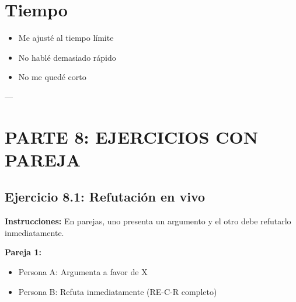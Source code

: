 \documentclass[a4paper,11pt]{article}
\begin{document}
\vspace{0.2cm}

\section{Tiempo}

\begin{itemize}

  \item [ ] Me ajusté al tiempo límite

  \item [ ] No hablé demasiado rápido

  \item [ ] No me quedé corto

\end{itemize}

\vspace{0.2cm}

---

\vspace{0.2cm}

\section{PARTE 8: EJERCICIOS CON PAREJA}

\vspace{0.2cm}

\subsection{Ejercicio 8.1: Refutación en vivo}

\vspace{0.2cm}

\textbf{Instrucciones:} En parejas, uno presenta un argumento y el otro debe refutarlo inmediatamente.

\vspace{0.2cm}

\textbf{Pareja 1:}

\begin{itemize}

  \item Persona A: Argumenta a favor de X

  \item Persona B: Refuta inmediatamente (RE-C-R completo)

\end{itemize}

\vspace{0.2cm}
\end{document}
